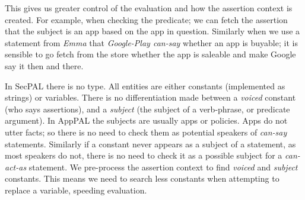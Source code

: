 \documentclass[]{scrartcl}
\begin{document}
This gives us greater control of the evaluation and how the assertion context is created.
For example, when checking the  predicate;
  we can fetch the assertion that the subject is an app based on the app in question.
Similarly when we use a statement from \emph{Emma} that \emph{Google-Play can-say} whether an app is buyable;
  it is sensible to go fetch from the store whether the app is saleable and make Google say it then and there.

In SecPAL there is no type.
All entities are either constants (implemented as strings) or variables.
There is no differentiation made between a \emph{voiced} constant (who says assertions),
and a \emph{subject} (the subject of a verb-phrase, or predicate argument).
In AppPAL the subjects are usually apps or policies.
Apps do not utter facts;
  so there is no need to check them as potential speakers of \emph{can-say} statements.
Similarly if a constant never appears as a subject of a statement, as most speakers do not,
  there is no need to check it as a possible subject for a \emph{can-act-as} statement.
We pre-process the assertion context to find \emph{voiced} and \emph{subject} constants.
This means we need to search less constants when attempting to replace a variable, speeding evaluation.
\end{document}
